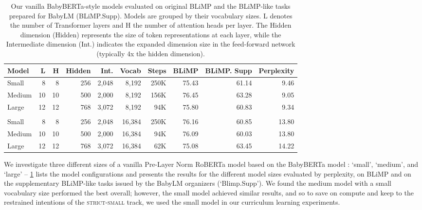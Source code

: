 \begin{table}
\centering
\small
\setlength{\tabcolsep}{4pt}  %
\begin{tabular}{l | rrrrr | rrrr}
\toprule
Model  & L & H & Hidden & Int. & Vocab & Steps & BLiMP & BLiMP. Supp & Perplexity \\
\midrule
Small  & 8 & 8 & 256 & 2,048   & 8,192   & 250K      & 75.43      & 61.14       & 9.46    \\
Medium & 10 & 10 & 500 & 2,000 & 8,192  & 156K      & 76.45      & 63.28        & 9.05  \\
Large  & 12 & 12 & 768 & 3,072 & 8,192   & 94K      & 75.80      & 60.83      & 9.34 \\[2mm]
\hline \\
Small  & 8 & 8 & 256 & 2,048   & 16,384  & 250K      & 76.16      & 60.85       & 13.80    \\
Medium & 10 & 10 & 500 & 2,000  & 16,384 & 94K      & 76.09      & 60.03        & 13.80     \\
Large  & 12 & 12 & 768 & 3,072 & 16,384  & 62K      & 75.08      & 63.45      & 14.22     \\
\bottomrule
\end{tabular}
\caption{\label{tbl:baseline-size-comparison} Our vanilla BabyBERTa-style models evaluated on original BLiMP and the BLiMP-like tasks prepared for BabyLM (BLiMP.Supp). Models are grouped by their vocabulary sizes. L denotes the number of Transformer layers and H the number of attention heads per layer. The Hidden dimension (Hidden) represents the size of token representations at each layer, while the Intermediate dimension (Int.) indicates the expanded dimension size in the feed-forward network (typically 4x the hidden dimension).}
\end{table}

We investigate three different sizes of a vanilla Pre-Layer Norm RoBERTa model \cite{liu2019roberta} based on the BabyBERTa model \cite{huebner2021babyberta}: `small', `medium', and `large' -- \cref{tbl:baseline-size-comparison} lists the model configurations and presents the results for the different model sizes evaluated by perplexity, on BLiMP \cite{warstadt2020blimp} and on the supplementary BLiMP-like tasks issued by the BabyLM organizers (`Blimp.Supp'). We found the medium model with a small vocabulary size performed the best overall; however, the small model achieved similar results, and so to save on compute and keep to the restrained intentions of the \textsc{strict-small} track, we used the small model in our curriculum learning experiments.

